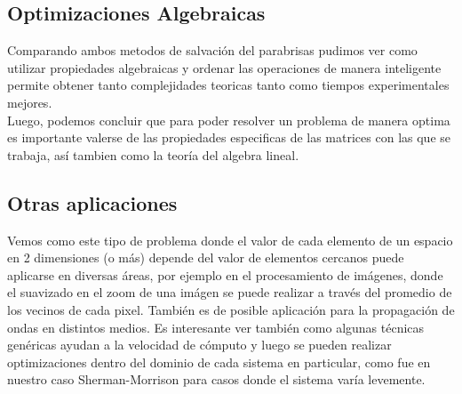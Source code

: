 \VER

\subsection{Optimizaciones Algebraicas}

Comparando ambos metodos de salvación del parabrisas pudimos ver como utilizar propiedades algebraicas y ordenar las operaciones de manera inteligente permite obtener tanto complejidades teoricas tanto como tiempos experimentales mejores.
\\
Luego, podemos concluir que para poder resolver un problema de manera optima es importante valerse de las propiedades especificas de las matrices con las que se trabaja, así tambien como la teoría del algebra lineal.

\subsection{Otras aplicaciones}

Vemos como este tipo de problema donde el valor de cada elemento de un espacio en 2 dimensiones (o m\'as) depende del valor de elementos cercanos puede aplicarse en diversas \'areas, por ejemplo en el procesamiento de im\'agenes, donde el suavizado en el zoom de una im\'agen se puede realizar a trav\'es del promedio de los vecinos de cada pixel. Tambi\'en es de posible aplicaci\'on para la propagaci\'on de ondas en distintos medios. Es interesante ver tambi\'en como algunas t\'ecnicas gen\'ericas ayudan a la velocidad de c\'omputo y luego se pueden realizar optimizaciones dentro del dominio de cada sistema en particular, como fue en nuestro caso Sherman-Morrison para casos donde el sistema var\'ia levemente.
